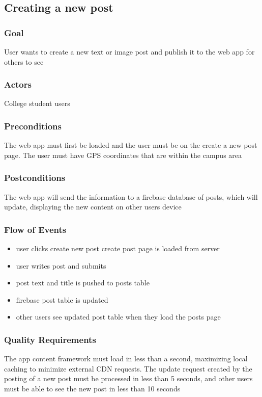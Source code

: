 \documentclass[12pt]{article}
\begin{document}
\subsection{Creating a new post}

\subsubsection{Goal}
User wants to create a new text or image post and publish it to the web app for others to see

\subsubsection{Actors}
College student users

\subsubsection{Preconditions}
The web app must first be loaded and the user must be on the create a new post page. The user must have GPS coordinates that are within the campus area

\subsubsection{Postconditions}
The web app will send the information to a firebase database of posts, which will update, displaying the new content on other users device

\subsubsection{Flow of Events}
\begin{itemize}
  \item user clicks create new post create post page is loaded from server
  \item user writes post and submits
  \item post text and title is pushed to posts table
  \item firebase post table is updated
  \item other users see updated post table when they load the posts page
\end{itemize}

\subsubsection{Quality Requirements}
The app content framework must load in less than a second, maximizing local caching to minimize external CDN requests.
The update request created by the posting of a new post must be processed in less than 5 seconds, and other users must be able to see the new post in less than 10 seconds
\end{document}

